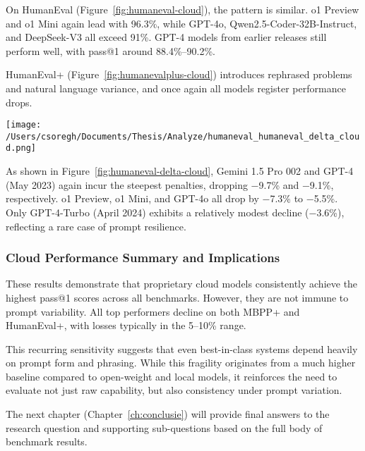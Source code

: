 On HumanEval (Figure~\ref{fig:humaneval-cloud}), the pattern is similar. o1 Preview and o1 Mini again lead with 96.3\%, while GPT-4o, Qwen2.5-Coder-32B-Instruct, and DeepSeek-V3 all exceed 91\%. GPT-4 models from earlier releases still perform well, with pass@1 around 88.4\%--90.2\%.

HumanEval+ (Figure~\ref{fig:humanevalplus-cloud}) introduces rephrased problems and natural language variance, and once again all models register performance drops.

\begin{center}
	\texttt{[image: /Users/csoregh/Documents/Thesis/Analyze/humaneval\_humaneval\_delta\_cloud.png]}
	\label{fig:humaneval-delta-cloud}
\end{center}

As shown in Figure~\ref{fig:humaneval-delta-cloud}, Gemini 1.5 Pro 002 and GPT-4 (May 2023) again incur the steepest penalties, dropping −9.7\% and −9.1\%, respectively. o1 Preview, o1 Mini, and GPT-4o all drop by −7.3\% to −5.5\%. Only GPT-4-Turbo (April 2024) exhibits a relatively modest decline (−3.6\%), reflecting a rare case of prompt resilience.

\subsubsection*{Cloud Performance Summary and Implications}

These results demonstrate that proprietary cloud models consistently achieve the highest pass@1 scores across all benchmarks. However, they are not immune to prompt variability. All top performers decline on both MBPP+ and HumanEval+, with losses typically in the 5--10\% range.

This recurring sensitivity suggests that even best-in-class systems depend heavily on prompt form and phrasing. While this fragility originates from a much higher baseline compared to open-weight and local models, it reinforces the need to evaluate not just raw capability, but also consistency under prompt variation.

The next chapter (Chapter~\ref{ch:conclusie}) will provide final answers to the research question and supporting sub-questions based on the full body of benchmark results.
